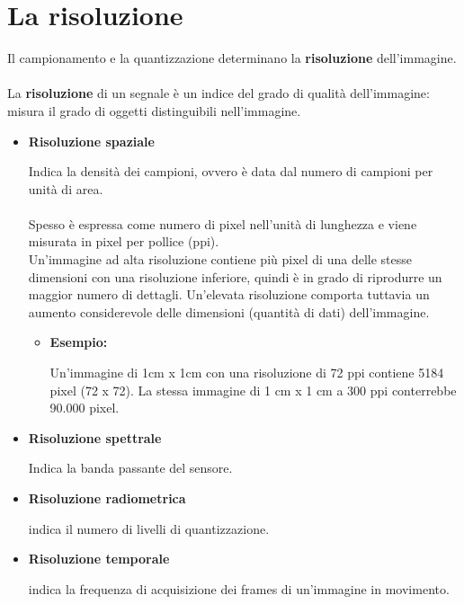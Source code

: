 \section{La risoluzione}
Il campionamento e la quantizzazione determinano la \textbf{risoluzione}
dell’immagine.
\\\\La \textbf{risoluzione} di un segnale è un indice del grado di qualità
dell’immagine: misura il grado di oggetti distinguibili
nell’immagine.
\begin{itemize}
    \item \textbf{Risoluzione spaziale}

          Indica la densità dei campioni, ovvero è data dal numero di campioni per unità di area.
          \\\\Spesso è espressa come numero di pixel nell’unità di lunghezza
          e viene misurata in pixel per pollice (ppi).
          \\Un’immagine ad alta risoluzione contiene più pixel di una delle
          stesse dimensioni con una risoluzione inferiore, quindi è in
          grado di riprodurre un maggior numero di dettagli. Un’elevata
          risoluzione comporta tuttavia un aumento considerevole delle
          dimensioni (quantità di dati) dell’immagine.
          \begin{itemize}
              \item \textbf{Esempio:}

                    Un’immagine di 1cm x 1cm con una risoluzione di 72 ppi
                    contiene 5184 pixel (72 x 72). La stessa immagine di 1 cm x 1 cm a 300 ppi conterrebbe 90.000 pixel.
          \end{itemize}
    \item \textbf{Risoluzione spettrale}

          Indica la banda passante del sensore.

    \item \textbf{Risoluzione radiometrica}

          indica il numero di livelli di quantizzazione.

    \item \textbf{Risoluzione temporale}

          indica la frequenza di acquisizione dei frames di un’immagine in movimento.
\end{itemize}
